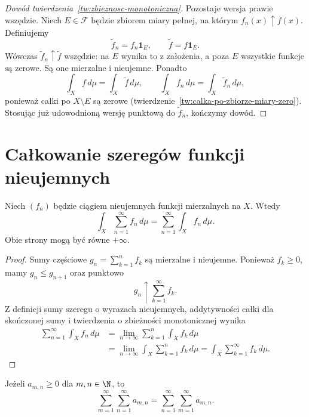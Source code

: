 \begin{proof}[Dowód twierdzenia~\ref{tw:zbieznosc-monotoniczna}]
Pozostaje wersja prawie wszędzie. Niech $E\in\mathcal F$ będzie
zbiorem miary pełnej, na którym $f_n(x)\uparrow f(x)$.
Definiujemy
\[
  \widetilde f_n=f_n\mathbf{1}_E,\qquad
  \widetilde f=f\mathbf{1}_E.
\]
Wówczas $\widetilde f_n\uparrow\widetilde f$ wszędzie: na $E$
wynika to z założenia, a poza $E$ wszystkie funkcje są zerowe.
Są one mierzalne i nieujemne. Ponadto
\[
  \int_X f\,d\mu=\int_X\widetilde f\,d\mu,
  \qquad
  \int_X f_n\,d\mu=\int_X\widetilde f_n\,d\mu,
\]
ponieważ całki po $X\setminus E$ są zerowe
(twierdzenie~\ref{tw:calka-po-zbiorze-miary-zero}). Stosując już
udowodnioną wersję punktową do $\widetilde f_n$, kończymy dowód.
\end{proof}

\section{Całkowanie szeregów funkcji nieujemnych}
\label{sec:calkowanie-szeregow-nieujemnych}

\begin{twierdzenie}
\label{tw:calkowanie-szeregow-nieujemnych}
Niech $(f_n)$ będzie ciągiem nieujemnych funkcji mierzalnych na $X$.
Wtedy
\begin{equation}
  \int_X\sum_{n=1}^\infty f_n\,d\mu
  =\sum_{n=1}^\infty\int_X f_n\,d\mu.
  \label{eq:calkowanie-szeregow-nieujemnych}
\end{equation}
Obie strony mogą być równe $+\infty$.
\end{twierdzenie}

\begin{proof}
Sumy częściowe $g_n=\sum_{k=1}^n f_k$ są mierzalne i nieujemne.
Ponieważ $f_k\geq0$, mamy $g_n\leq g_{n+1}$ oraz punktowo
\[
  g_n\uparrow\sum_{k=1}^\infty f_k.
\]
Z definicji sumy szeregu o wyrazach nieujemnych, addytywności całki
dla skończonej sumy i twierdzenia o zbieżności monotonicznej wynika
\begin{align*}
  \sum_{n=1}^\infty\int_X f_n\,d\mu
  &=\lim_{n\to\infty}\sum_{k=1}^n\int_X f_k\,d\mu\\
  &=\lim_{n\to\infty}\int_X\sum_{k=1}^n f_k\,d\mu
  =\int_X\sum_{k=1}^\infty f_k\,d\mu.
\end{align*}
\end{proof}

\begin{wniosek}
\label{wn:zamiana-kolejnosci-sum-nieujemnych}
Jeżeli $a_{m,n}\geq0$ dla $m,n\in\N$, to
\begin{equation}
  \sum_{m=1}^\infty\sum_{n=1}^\infty a_{m,n}
  =\sum_{n=1}^\infty\sum_{m=1}^\infty a_{m,n}.
  \label{eq:zamiana-kolejnosci-sum-nieujemnych}
\end{equation}
\end{wniosek}

